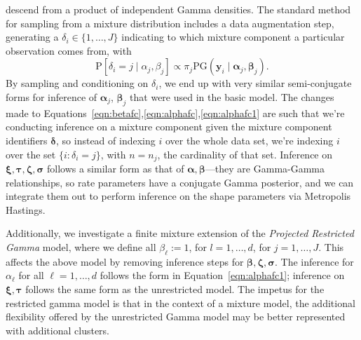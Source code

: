   descend from a product of independent Gamma densities. The standard method for sampling from a
  mixture distribution includes a data augmentation step, generating a
  $\delta_i \in \lbrace 1,\ldots, J\rbrace$ indicating to which mixture component a
  particular observation comes from, with
  \begin{equation*}
    \text{P}\left[\delta_i = j\mid\alpha_j,\beta_j\right] \propto \pi_j\text{PG}\left(\bm{ y}_i\mid \bm{ \alpha}_j,\bm{ \beta}_j\right).
  \end{equation*}
  By sampling and conditioning on $\delta_i$, we end up with very similar semi-conjugate forms for
  inference of $\bm{ \alpha}_j$, $\bm{ \beta}_j$ that were used in the basic model.  The changes made
  to Equations~\ref{eqn:betafc},\ref{eqn:alphafc},\ref{eqn:alphafc1} are such that we're conducting inference
  on a mixture component given the mixture component identifiers $\bm{ \delta}$, so instead of indexing
  $i$ over the whole data set, we're indexing $i$ over the set $\{i :\delta_i = j\}$, with $n = n_j$,
  the cardinality of that set. Inference on $\bm{ \xi,\tau,\zeta,\sigma}$ follows a similar form as
  that of $\bm{ \alpha,\beta}$---they are Gamma-Gamma relationships, so rate parameters have a conjugate
  Gamma posterior, and we can integrate them out to perform inference on the shape parameters via
  Metropolis Hastings.

Additionally, we investigate a finite mixture extension of the \emph{Projected Restricted Gamma} model,
  where we define all $\beta_{\ell} := 1$, for $l = 1,\ldots,d$, for $j = 1,\ldots,J$.  This affects the above
  model by removing inference steps for $\bm{ \beta},\bm{ \zeta},\bm{ \sigma}$.  The inference for
  $\alpha_{\ell}$ for all $\ell = 1,\ldots,d$ follows the form in Equation~\ref{eqn:alphafc1}; inference on
  $\bm{ \xi,\tau}$ follows the same form as the unrestricted model.  The impetus for the restricted
  gamma model is that in the context of a mixture model, the additional flexibility offered by the
  unrestricted Gamma model may be better represented with additional clusters.

